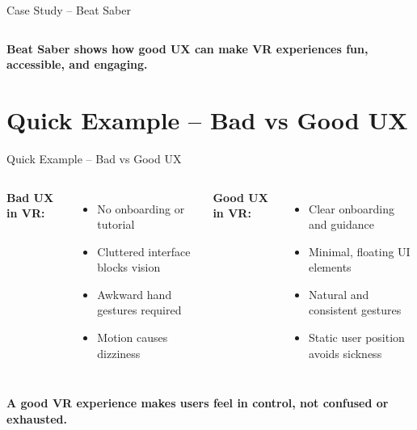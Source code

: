 \documentclass[aspectratio=169, table]{beamer}
\begin{document}
\begin{frame}{Case Study – Beat Saber}
\begin{columns}[T]
\begin{column}{0.75\textwidth}
		\end{column}
		\begin{column}{0.2\textwidth}
		\end{column}
	\end{columns}

				\vspace{10pt}
\small \textbf{Beat Saber shows how good UX can make VR experiences fun, accessible, and engaging.}
\end{frame}


\section{Quick Example – Bad vs Good UX}
\begin{frame}{Quick Example – Bad vs Good UX}
	\vspace{8pt}
	\begin{columns}[T]
		\textbf{Bad UX in VR:}
		\begin{itemize}
			\item No onboarding or tutorial
			\item Cluttered interface blocks vision
			\item Awkward hand gestures required
			\item Motion causes dizziness
		\end{itemize}
		
		\textbf{Good UX in VR:}
		\begin{itemize}
			\item Clear onboarding and guidance
			\item Minimal, floating UI elements
			\item Natural and consistent gestures
			\item Static user position avoids sickness
		\end{itemize}
	\end{columns}
	
	\vspace{20pt}
	\centering
	\textbf{\large{A good VR experience makes users feel in control, not confused or exhausted.}}
\end{frame}
\end{document}
